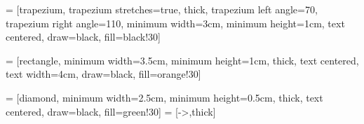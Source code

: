  = [trapezium,
trapezium stretches=true, %
thick,
trapezium left angle=70,
trapezium right angle=110,
minimum width=3cm,
minimum height=1cm, text centered,
draw=black, fill=black!30]

 = [rectangle,
minimum width=3.5cm,
minimum height=1cm,
thick,
text centered,
text width=4cm,
draw=black,
fill=orange!30]

 = [diamond,
minimum width=2.5cm,
minimum height=0.5cm,
thick,
text centered,
draw=black,
fill=green!30]
 = [->,thick]


\usepackage{sankey}